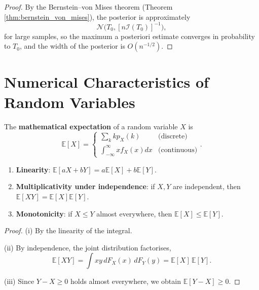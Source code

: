 \begin{proof}
By the Bernstein--von Mises theorem (Theorem \ref{thm:bernstein_von_mises}),
the posterior is approximately
\[
\mathcal{N}\!\bigl(T_0, [n\mathcal{I}(T_0)]^{-1}\bigr),
\]
for large samples,
so the maximum a posteriori estimate converges in probability to $T_0$,
and the width of the posterior is $O(n^{-1/2})$.
\end{proof}

\section{Numerical Characteristics of Random Variables}\label{sec:numerical_characteristics}

\begin{definition}\label{def:mathematical_expectation}
The \textbf{mathematical expectation} of a random variable $X$ is
\[
\mathbb{E}[X] =
\begin{cases}
\sum_k k p_X(k) & \text{(discrete)} \\
\int_{-\infty}^{\infty} x f_X(x) dx & \text{(continuous)}
\end{cases}.
\]
\end{definition}

\begin{property}\label{prop:expectation_properties}
\begin{enumerate}[label=(\roman*)]
    \item \textbf{Linearity}: $\mathbb{E}[aX + bY] = a\mathbb{E}[X] + b\mathbb{E}[Y]$.
    \item \textbf{Multiplicativity under independence}: if $X, Y$ are independent, then $\mathbb{E}[XY] = \mathbb{E}[X]\mathbb{E}[Y]$.
    \item \textbf{Monotonicity}: if $X \le Y$ almost everywhere, then $\mathbb{E}[X] \le \mathbb{E}[Y]$.
\end{enumerate}
\end{property}

\begin{proof}
(i) By the linearity of the integral.

(ii) By independence, the joint distribution factorises,
\[
\mathbb{E}[XY]
= \int xy \, dF_X(x)\,dF_Y(y)
= \mathbb{E}[X]\,\mathbb{E}[Y].
\]

(iii) Since $Y - X \ge 0$ holds almost everywhere,
we obtain $\mathbb{E}[Y - X] \ge 0$.
\end{proof}

